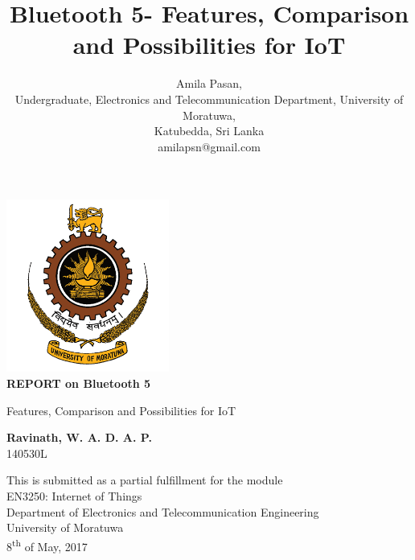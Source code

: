 \documentclass[journal, a4paper]{IEEEtran}
\begin{document}
\begin{titlepage}
    \begin{center}
        \vspace*{1cm}
        \includegraphics[width=0.4\textwidth]{logo.png}\\
        \textbf{REPORT on Bluetooth 5}
        
        \vspace{0.5cm}
        Features, Comparison and Possibilities for IoT
        
        \vspace{8cm}
        
        \textbf{Ravinath, W. A. D. A. P.}\\
        140530L
        
        \vfill
				\vfill
        
        This is submitted as a partial fulfillment for the module\\
        EN3250: Internet of Things\\
				Department of Electronics and Telecommunication Engineering\\
				University of Moratuwa\\
				8\textsuperscript{th} of May, 2017\\         
    \end{center}
\end{titlepage}


\title{Bluetooth 5- Features, Comparison and Possibilities for IoT}
	\author{Amila Pasan,\\
	Undergraduate, Electronics and Telecommunication Department, University of Moratuwa,\\
	Katubedda, Sri Lanka\\
	amilapsn@gmail.com}
\end{document}

